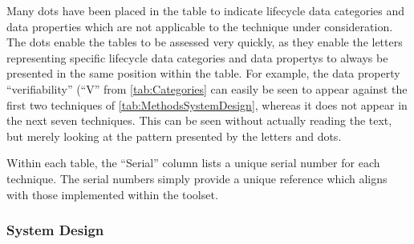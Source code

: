 Many dots have been placed in the table to indicate lifecycle data categories and data properties which are not applicable to the technique under consideration. The dots enable the tables to be assessed very quickly, as they enable the letters representing specific lifecycle data categories and \glspl{data property} to always be presented in the same position within the table. For example, the \gls{data property} ``\gls{verifiability}'' (``V'' from \autoref{tab:Categories} can easily be seen to appear against the first two techniques of \autoref{tab:MethodsSystemDesign}, whereas it does not appear in the next seven techniques. This can be seen without actually reading the text, but merely looking at the pattern presented by the letters and dots. 

Within each table, the ``Serial'' column lists a unique serial number for each technique. The serial numbers simply provide a unique reference which aligns with those implemented within the toolset.

\subsubsection{System Design}

